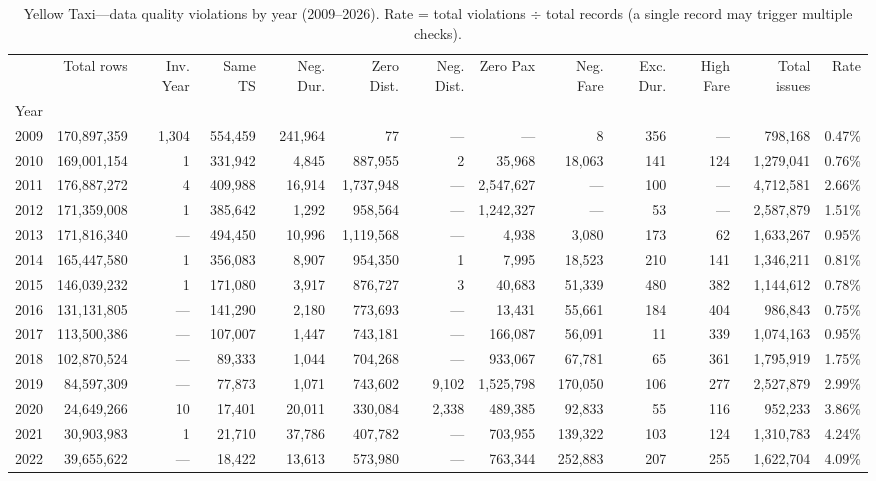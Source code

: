 \begin{table}
\caption{Yellow Taxi---data quality violations by year (2009--2026). Rate = total violations $\div$ total records (a single record may trigger multiple checks).}
\label{tab:t2_yellow_tripdata}
\begin{tabular}{rrrrrrrrrrrrr}
\toprule
 & Total rows & Inv. Year & Same TS & Neg. Dur. & Zero Dist. & Neg. Dist. & Zero Pax & Neg. Fare & Exc. Dur. & High Fare & Total issues & Rate \\
Year &  &  &  &  &  &  &  &  &  &  &  &  \\
\midrule
2009 & 170,897,359 & 1,304 & 554,459 & 241,964 & 77 & --- & --- & 8 & 356 & --- & 798,168 & 0.47\% \\
2010 & 169,001,154 & 1 & 331,942 & 4,845 & 887,955 & 2 & 35,968 & 18,063 & 141 & 124 & 1,279,041 & 0.76\% \\
2011 & 176,887,272 & 4 & 409,988 & 16,914 & 1,737,948 & --- & 2,547,627 & --- & 100 & --- & 4,712,581 & 2.66\% \\
2012 & 171,359,008 & 1 & 385,642 & 1,292 & 958,564 & --- & 1,242,327 & --- & 53 & --- & 2,587,879 & 1.51\% \\
2013 & 171,816,340 & --- & 494,450 & 10,996 & 1,119,568 & --- & 4,938 & 3,080 & 173 & 62 & 1,633,267 & 0.95\% \\
2014 & 165,447,580 & 1 & 356,083 & 8,907 & 954,350 & 1 & 7,995 & 18,523 & 210 & 141 & 1,346,211 & 0.81\% \\
2015 & 146,039,232 & 1 & 171,080 & 3,917 & 876,727 & 3 & 40,683 & 51,339 & 480 & 382 & 1,144,612 & 0.78\% \\
2016 & 131,131,805 & --- & 141,290 & 2,180 & 773,693 & --- & 13,431 & 55,661 & 184 & 404 & 986,843 & 0.75\% \\
2017 & 113,500,386 & --- & 107,007 & 1,447 & 743,181 & --- & 166,087 & 56,091 & 11 & 339 & 1,074,163 & 0.95\% \\
2018 & 102,870,524 & --- & 89,333 & 1,044 & 704,268 & --- & 933,067 & 67,781 & 65 & 361 & 1,795,919 & 1.75\% \\
2019 & 84,597,309 & --- & 77,873 & 1,071 & 743,602 & 9,102 & 1,525,798 & 170,050 & 106 & 277 & 2,527,879 & 2.99\% \\
2020 & 24,649,266 & 10 & 17,401 & 20,011 & 330,084 & 2,338 & 489,385 & 92,833 & 55 & 116 & 952,233 & 3.86\% \\
2021 & 30,903,983 & 1 & 21,710 & 37,786 & 407,782 & --- & 703,955 & 139,322 & 103 & 124 & 1,310,783 & 4.24\% \\
2022 & 39,655,622 & --- & 18,422 & 13,613 & 573,980 & --- & 763,344 & 252,883 & 207 & 255 & 1,622,704 & 4.09\% \\

\end{tabular}
\end{table}
